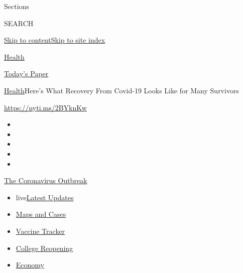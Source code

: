 Sections

SEARCH

\protect\hyperlink{site-content}{Skip to
content}\protect\hyperlink{site-index}{Skip to site index}

\href{https://www.nytimes.com/section/health}{Health}

\href{https://myaccount.nytimes.com/auth/login?response_type=cookie\&client_id=vi}{}

\href{https://www.nytimes.com/section/todayspaper}{Today's Paper}

\href{/section/health}{Health}\textbar{}Here's What Recovery From
Covid-19 Looks Like for Many Survivors

\url{https://nyti.ms/2BYknKw}

\begin{itemize}
\item
\item
\item
\item
\item
\end{itemize}

\href{https://www.nytimes.com/news-event/coronavirus?action=click\&pgtype=Article\&state=default\&region=TOP_BANNER\&context=storylines_menu}{The
Coronavirus Outbreak}

\begin{itemize}
\tightlist
\item
  live\href{https://www.nytimes.com/2020/08/04/world/coronavirus-covid-19.html?action=click\&pgtype=Article\&state=default\&region=TOP_BANNER\&context=storylines_menu}{Latest
  Updates}
\item
  \href{https://www.nytimes.com/interactive/2020/us/coronavirus-us-cases.html?action=click\&pgtype=Article\&state=default\&region=TOP_BANNER\&context=storylines_menu}{Maps
  and Cases}
\item
  \href{https://www.nytimes.com/interactive/2020/science/coronavirus-vaccine-tracker.html?action=click\&pgtype=Article\&state=default\&region=TOP_BANNER\&context=storylines_menu}{Vaccine
  Tracker}
\item
  \href{https://www.nytimes.com/2020/08/02/us/covid-college-reopening.html?action=click\&pgtype=Article\&state=default\&region=TOP_BANNER\&context=storylines_menu}{College
  Reopening}
\item
  \href{https://www.nytimes.com/live/2020/08/03/business/stock-market-today-coronavirus?action=click\&pgtype=Article\&state=default\&region=TOP_BANNER\&context=storylines_menu}{Economy}
\end{itemize}


